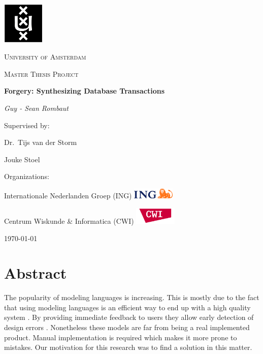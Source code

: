 \documentclass[oneside]{book}
\begin{document}
\begin{titlepage}
	\centering
	\includegraphics[width=0.15\textwidth]{logo-uva}\par\vspace{2.5mm}
	{\scshape\LARGE University of Amsterdam \par}
	\vspace{2mm}
	{\scshape\Large Master Thesis Project\par}
	\vspace{1.5cm}
	{\Huge\bfseries Forgery: Synthesizing Database Transactions\par}
	\vspace{1cm}
	{\Large\itshape Guy - Sean Rombaut\par}
	\vfill
	Supervised by:\par
	Dr.~Tijs van der Storm\par
	Jouke Stoel\par
	\vspace{1cm}
	Organizations:\par
		 Internationale Nederlanden Groep (ING) \hfill  \includegraphics[width=0.15\textwidth]{ING}\par
	 Centrum Wiskunde \& Informatica (CWI)  \hfill  \includegraphics[width=0.15\textwidth]{CWIlogo}

	\vfill

	{\large \today\par}
\end{titlepage}

\tableofcontents
\newpage

\chapter{Abstract}
The popularity of modeling languages is increasing. This is mostly due to the fact that using modeling languages is an efficient way to end up with a high quality system \cite[p. ~6]{abstractions}. By providing immediate feedback to users they allow early detection of design errors \cite{lightning}. Nonetheless these models are far from being a real implemented product. Manual implementation is required which makes it more prone to mistakes. Our motivation for this research was to find a solution in this matter.\\
\end{document}
